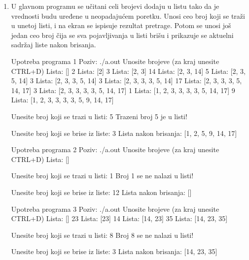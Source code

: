 \begin{Exercise}[label=601]
\begin{enumerate}
\item[(3)] U glavnom programu se učitani celi brojevi dodaju u listu tako da je vrednosti budu uređene u neopadajućem poretku. 
    Unosi ceo broj koji se traži u unetoj listi, i na ekran se ispisuje rezultat pretrage. 
    Potom se unosi još jedan ceo broj čija se sva pojavljivanja u listi brišu i prikazuje se aktuelni sadržaj liste nakon brisanja.
\begin{maxitest}
\begin{test}{Upotreba programa 1}
Poziv: ./a.out
Unosite brojeve (za kraj unesite CTRL+D)
  Lista: []
2
  Lista: [2]
3
  Lista: [2, 3]
14
  Lista: [2, 3, 14]
5
  Lista: [2, 3, 5, 14]
3
  Lista: [2, 3, 3, 5, 14]
3
  Lista: [2, 3, 3, 3, 5, 14]
17
  Lista: [2, 3, 3, 3, 5, 14, 17]
3
  Lista: [2, 3, 3, 3, 3, 5, 14, 17]
1
  Lista: [1, 2, 3, 3, 3, 3, 5, 14, 17]
9
  Lista: [1, 2, 3, 3, 3, 3, 5, 9, 14, 17]

Unesite broj koji se trazi u listi: 5
Trazeni broj 5 je u listi!

Unesite broj koji se brise iz liste: 3
Lista nakon brisanja:  [1, 2, 5, 9, 14, 17]
\end{test}
\end{maxitest}
\begin{maxitest}
\begin{test}{Upotreba programa 2}
Poziv: ./a.out
Unosite brojeve (za kraj unesite CTRL+D)
  Lista: []

Unesite broj koji se trazi u listi: 1
Broj 1 se ne nalazi u listi!

Unesite broj koji se brise iz liste: 12
Lista nakon brisanja:  []
\end{test}
\end{maxitest}
\begin{maxitest}
\begin{test}{Upotreba programa 3}
Poziv: ./a.out
Unosite brojeve (za kraj unesite CTRL+D)
  Lista: []
23
  Lista: [23]
14
  Lista: [14, 23]
35
  Lista: [14, 23, 35]

Unesite broj koji se trazi u listi: 8
Broj 8 se ne nalazi u listi!

Unesite broj koji se brise iz liste: 3
Lista nakon brisanja:  [14, 23, 35]
\end{test}
\end{maxitest}
\end{enumerate}
\end{Exercise}
\begin{Answer}[ref=601]
\end{Answer}

